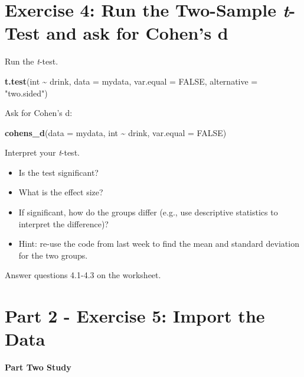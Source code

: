 \documentclass[
]{book}
\newenvironment{Shaded}{\begin{snugshade}}{\end{snugshade}}
\newcommand{\AttributeTok}[1]{\textcolor[rgb]{0.13,0.29,0.53}{#1}}
\newcommand{\ConstantTok}[1]{\textcolor[rgb]{0.56,0.35,0.01}{#1}}
\newcommand{\FunctionTok}[1]{\textcolor[rgb]{0.13,0.29,0.53}{\textbf{#1}}}
\newcommand{\NormalTok}[1]{#1}
\newcommand{\SpecialCharTok}[1]{\textcolor[rgb]{0.81,0.36,0.00}{\textbf{#1}}}
\newcommand{\StringTok}[1]{\textcolor[rgb]{0.31,0.60,0.02}{#1}}
\let\oldsection\section
\renewcommand{\section}{\needspace{5\baselineskip}\oldsection}
\begin{document}
\section{\texorpdfstring{Exercise 4: Run the Two-Sample \emph{t}-Test and ask for Cohen's d}{Exercise 4: Run the Two-Sample t-Test and ask for Cohen's d}}\label{exercise-4-run-the-two-sample-t-test-and-ask-for-cohens-d}

Run the \emph{t}-test.

\begin{Shaded}
\begin{Highlighting}[]
\FunctionTok{t.test}\NormalTok{(int }\SpecialCharTok{\textasciitilde{}}\NormalTok{ drink, }\AttributeTok{data =}\NormalTok{ mydata, }\AttributeTok{var.equal =} \ConstantTok{FALSE}\NormalTok{, }\AttributeTok{alternative =} \StringTok{"two.sided"}\NormalTok{)}
\end{Highlighting}
\end{Shaded}

Ask for Cohen's d:

\begin{Shaded}
\begin{Highlighting}[]
\FunctionTok{cohens\_d}\NormalTok{(}\AttributeTok{data =}\NormalTok{ mydata, int }\SpecialCharTok{\textasciitilde{}}\NormalTok{ drink, }\AttributeTok{var.equal =} \ConstantTok{FALSE}\NormalTok{)}
\end{Highlighting}
\end{Shaded}

Interpret your \emph{t}-test.

\begin{itemize}
\item
  Is the test significant?
\item
  What is the effect size?
\item
  If significant, how do the groups differ (e.g., use descriptive statistics to interpret the difference)?
\item
  Hint: re-use the code from last week to find the mean and standard deviation for the two groups.
\end{itemize}

Answer questions 4.1-4.3 on the worksheet.

\section{Part 2 - Exercise 5: Import the Data}\label{part-2---exercise-5-import-the-data}

\textbf{Part Two Study}
\end{document}
